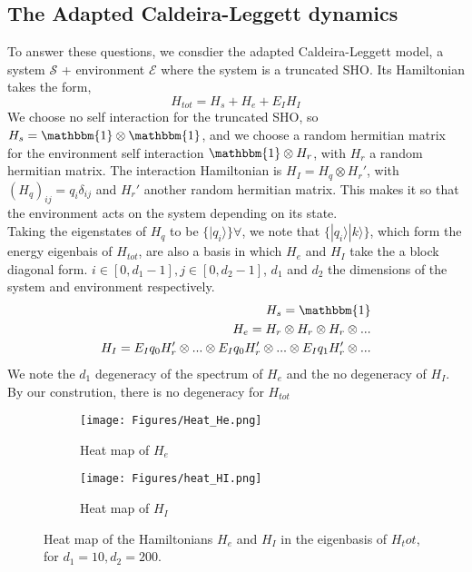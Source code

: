 \documentclass{article}
\begin{document}
\subsection{The Adapted Caldeira-Leggett dynamics}
To answer these questions, we consdier the adapted Caldeira-Leggett model, a system $\mathcal{S}$ + environment $\mathcal{E}$ where the system is a truncated SHO. Its Hamiltonian takes the form,
\begin{equation}    
    H_{tot}=H_s+H_e+E_IH_I
\end{equation}
We choose no self interaction for the truncated SHO, so $H_s=\mathbbm{1}\otimes\mathbbm{1}$, and we choose a random hermitian matrix for the environment self interaction $\mathbbm{1}\otimes H_r$, with $H_r$ a random hermitian matrix. The interaction Hamiltonian is $H_I=H_q\otimes H_r'$, with $(H_q)_{ij}=q_i\delta_{ij}$ and $H_r'$ another random hermitian matrix. This makes it so that the environment acts on the system depending on its state. \\
Taking the eigenstates of $H_q$ to be $\{|q_i\rangle\}\forall$, we
note that $\{|q_i\rangle|k\rangle\}$, which form the energy eigenbais of $H_{tot}$, are also a basis in which $H_e$ and $H_I$ take the a block diagonal form. $i\in[0,d_1-1],j\in [0,d_2-1]$, $d_1$ and $d_2$ the dimensions of the system and environment respectively.
\begin{align*}
    H_s=\mathbbm{1}\\
    H_e = H_{r}\otimes H_r\otimes H_r\otimes ... \\
    H_I = E_Iq_0H_{r}'\otimes...\otimes E_Iq_0H_{r}'\otimes ...\otimes E_Iq_1H_{r}'\otimes ...
\end{align*}
We note the $d_1$ degeneracy of the spectrum of $H_e$ and the no degeneracy of $H_I$. By our constrution, there is no degeneracy for $H_{tot}$\\

\begin{figure}[h!]
  \centering
  \begin{subfigure}[b]{0.4\linewidth}
    \texttt{[image: Figures/Heat\_He.png]}
    \label{fig:1}
    \caption{Heat map of $H_e$}
  \end{subfigure}
  \begin{subfigure}[b]{0.4\linewidth}
    \texttt{[image: Figures/heat\_HI.png]}
    \label{fig:2}
    \caption{Heat map of $H_I$}
  \end{subfigure}
  \caption{}
  \label{fig:dist_EI_dep}
  \caption{Heat map of the Hamiltonians $H_e$ and $H_I$ in the eigenbasis of $H_tot$, for $d_1=10,d_2=200$.}
\end{figure}
\end{document}
